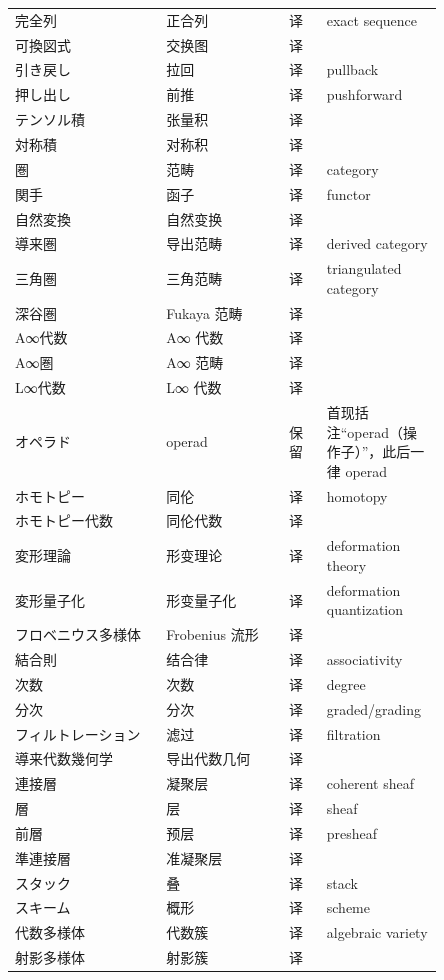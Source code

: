 {\begin{longtable}{p{0.32\linewidth} p{0.26\linewidth} p{0.08\linewidth} p{0.19\linewidth}}
完全列 & 正合列 & 译 & exact sequence \\
可換図式 & 交换图 & 译 &  \\
引き戻し & 拉回 & 译 & pullback \\
押し出し & 前推 & 译 & pushforward \\
テンソル積 & 张量积 & 译 &  \\
対称積 & 对称积 & 译 &  \\
圏 & 范畴 & 译 & category \\
関手 & 函子 & 译 & functor \\
自然変換 & 自然变换 & 译 &  \\
導来圏 & 导出范畴 & 译 & derived category \\
三角圏 & 三角范畴 & 译 & triangulated category \\
深谷圏 & Fukaya 范畴 & 译 &  \\
A∞代数 & A∞ 代数 & 译 &  \\
A∞圏 & A∞ 范畴 & 译 &  \\
L∞代数 & L∞ 代数 & 译 &  \\
オペラド & operad & 保留 & 首现括注“operad（操作子）”，此后一律 operad \\
ホモトピー & 同伦 & 译 & homotopy \\
ホモトピー代数 & 同伦代数 & 译 &  \\
変形理論 & 形变理论 & 译 & deformation theory \\
変形量子化 & 形变量子化 & 译 & deformation quantization \\
フロベニウス多様体 & Frobenius 流形 & 译 &  \\
結合則 & 结合律 & 译 & associativity \\
次数 & 次数 & 译 & degree \\
分次 & 分次 & 译 & graded/grading \\
フィルトレーション & 滤过 & 译 & filtration \\
導来代数幾何学 & 导出代数几何 & 译 &  \\
連接層 & 凝聚层 & 译 & coherent sheaf \\
層 & 层 & 译 & sheaf \\
前層 & 预层 & 译 & presheaf \\
準連接層 & 准凝聚层 & 译 &  \\
スタック & 叠 & 译 & stack \\
スキーム & 概形 & 译 & scheme \\
代数多様体 & 代数簇 & 译 & algebraic variety \\
射影多様体 & 射影簇 & 译 &  \\

\end{longtable}}
